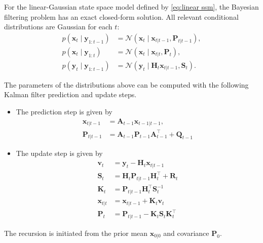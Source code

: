 \begin{theorem}\label{thm: kalman filter}
For the linear-Gaussian state space model defined by \eqref{eq:linear ssm}, the Bayesian filtering problem has an exact closed-form solution. All relevant conditional distributions are Gaussian for each $t$:    
\begin{equation}\label{eq:Kalman filter distributions}
    \begin{aligned}
        p(\mathbf{x}_t \mid \mathbf{y}_{1:t-1})&= \mathcal{N}(\mathbf{x}_t \mid\mathbf{x}_{t|t-1},\mathbf{P}_{t|t-1}), \\
        p(\mathbf{x}_t \mid \mathbf{y}_{1:t})&= \mathcal{N}(\mathbf{x}_t \mid \mathbf{x}_{t|t},\mathbf{P}_t), \\
        p(\mathbf{y}_t \mid \mathbf{y}_{1:t-1})&= \mathcal{N}(\mathbf{y}_t \mid \mathbf{H}_t\mathbf{x}_{t|t-1},\mathbf{S}_t).
    \end{aligned}
\end{equation}

The parameters of the distributions above can be computed with the following Kalman filter prediction and update steps.

\begin{itemize}
    \item The prediction step is given by
    \begin{align}
        \mathbf{x}_{t|t-1} &= \mathbf{A}_{t-1}\mathbf{x}_{t-1|t-1}, \nonumber\\
        \mathbf{P}_{t|t-1} &= \mathbf{A}_{t-1}\mathbf{P}_{t-1}\mathbf{A}_{t-1}^\top + \mathbf{Q}_{t-1}
    \end{align}

    \item The update step is given by
    \begin{align}
        \mathbf{v}_t &= \mathbf{y}_t - \mathbf{H}_t\mathbf{x}_{t|t-1} \nonumber\\
        \mathbf{S}_t &= \mathbf{H}_t\mathbf{P}_{t|t-1}\mathbf{H}_{t}^\top + \mathbf{R}_t \nonumber\\
        \mathbf{K}_t &= \mathbf{P}_{t|t-1}\mathbf{H}_t^\top\mathbf{S}_t^{-1} \nonumber\\
        \mathbf{x}_{t|t} &= \mathbf{x}_{t|t-1} + \mathbf{K}_t\mathbf{v}_t \nonumber\\
        \mathbf{P}_t &= \mathbf{P}_{t|t-1} - \mathbf{K}_t\mathbf{S}_t \mathbf{K}_t^\top
    \end{align}
\end{itemize}
The recursion is initiated from the prior mean $\mathbf{x}_{0|0}$ and covariance $\mathbf{P}_0$.
\end{theorem}

